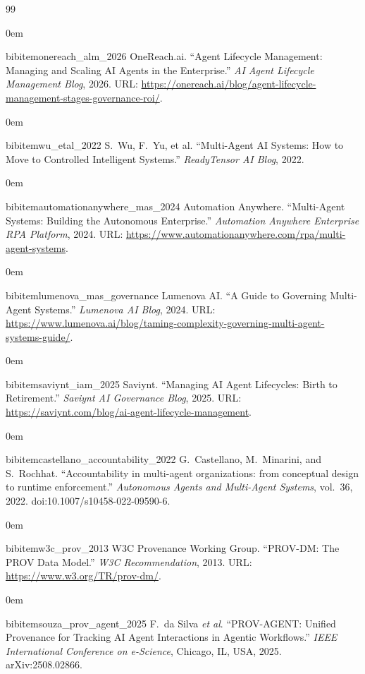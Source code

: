 \begin{thebibliography}{99}
\raggedright

\itemsep0em

bibitem{onereach_alm_2026}
OneReach.ai.
``Agent Lifecycle Management: Managing and Scaling AI Agents in the Enterprise.''%
\textit{AI Agent Lifecycle Management Blog}, 2026.
URL: \url{https://onereach.ai/blog/agent-lifecycle-management-stages-governance-roi/}.

\itemsep0em

bibitem{wu_etal_2022}
S.~Wu, F.~Yu, et al.
``Multi-Agent AI Systems: How to Move to Controlled Intelligent Systems.''%
\textit{ReadyTensor AI Blog}, 2022.

\itemsep0em

bibitem{automationanywhere_mas_2024}
Automation Anywhere.
``Multi-Agent Systems: Building the Autonomous Enterprise.''%
\textit{Automation Anywhere Enterprise RPA Platform}, 2024.
URL: \url{https://www.automationanywhere.com/rpa/multi-agent-systems}.

\itemsep0em

bibitem{lumenova_mas_governance}
Lumenova AI.
``A Guide to Governing Multi-Agent Systems.''%
\textit{Lumenova AI Blog}, 2024.
URL: \url{https://www.lumenova.ai/blog/taming-complexity-governing-multi-agent-systems-guide/}.

\itemsep0em

bibitem{saviynt_iam_2025}
Saviynt.
``Managing AI Agent Lifecycles: Birth to Retirement.''%
\textit{Saviynt AI Governance Blog}, 2025.
URL: \url{https://saviynt.com/blog/ai-agent-lifecycle-management}.

\itemsep0em

bibitem{castellano_accountability_2022}
G.~Castellano, M.~Minarini, and S.~Rochhat.
``Accountability in multi-agent organizations: from conceptual design to runtime enforcement.''%
\textit{Autonomous Agents and Multi-Agent Systems}, vol.~36, 2022.
doi:10.1007/s10458-022-09590-6.

\itemsep0em

bibitem{w3c_prov_2013}
W3C Provenance Working Group.
``PROV-DM: The PROV Data Model.''%
\textit{W3C Recommendation}, 2013.
URL: \url{https://www.w3.org/TR/prov-dm/}.

\itemsep0em

bibitem{souza_prov_agent_2025}
F.~da Silva \emph{et al}.
``PROV-AGENT: Unified Provenance for Tracking AI Agent Interactions in Agentic Workflows.''%
\textit{IEEE International Conference on e-Science}, Chicago, IL, USA, 2025.
arXiv:2508.02866.


\end{thebibliography}
